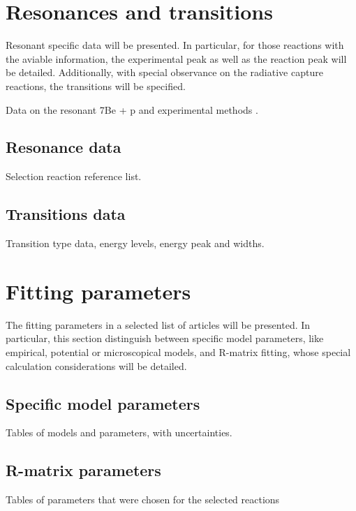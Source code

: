 \documentclass[openany]{book}
\begin{document}
\section{Resonances and transitions} \label{sec:resonancesTransitions}

Resonant specific data will be presented. In particular, for those reactions with the aviable information, the experimental peak as well as the reaction peak will be detailed. Additionally, with special observance on the radiative capture reactions, the transitions will be specified.

Data on the resonant 7Be + p and experimental methods \cite{buompane_dileva_gialanella_d'onofrio_decesare_duarte_fulop_gasques_gyurky_morales-gallegos_et_2022}.

\subsection{Resonance data}

Selection reaction reference list.

\subsection{Transitions data}

Transition type data, energy levels, energy peak and widths.

\section{Fitting parameters} \label{sec:fittingParams}

The fitting parameters in a selected list of articles will be presented. In particular, this section distinguish between specific model parameters, like empirical, potential or microscopical models, and R-matrix fitting, whose special calculation considerations will be detailed.

\subsection{Specific model parameters}

Tables of models and parameters, with uncertainties. 

\subsection{R-matrix parameters}

Tables of parameters that were chosen for the selected reactions
\end{document}
